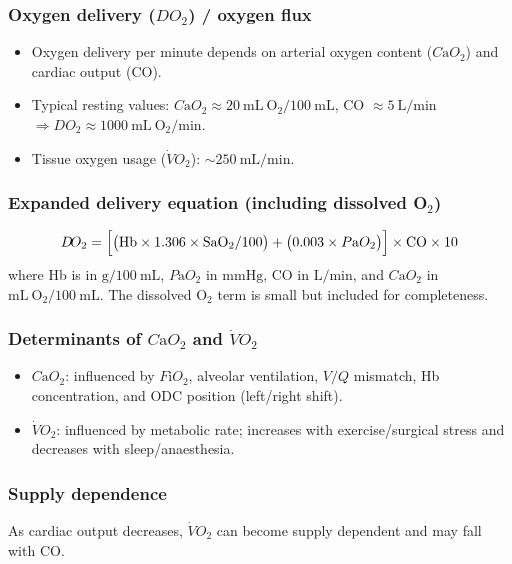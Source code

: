 \documentclass[11pt,a4paper]{article}
\begin{document}
\subsubsection{Oxygen delivery (\(D\!O_2\)) / oxygen flux}
\begin{itemize}
  \item Oxygen delivery per minute depends on arterial oxygen content (\(C\mathrm{a}O_2\)) and cardiac output (CO).
  \item Typical resting values: \(C\mathrm{a}O_2 \approx 20~\mathrm{mL~O_2}/100~\mathrm{mL}\), CO \(\approx 5~\mathrm{L/min}\) \(\Rightarrow D\!O_2 \approx 1000~\mathrm{mL~O_2/min}\).
  \item Tissue oxygen usage (\(\dot V\!O_2\)): \(\sim 250~\mathrm{mL/min}\).
\end{itemize}

\subsubsection{Expanded delivery equation (including dissolved O\(_2\))}
\[
D\!O_2 =
\Bigl[\bigl(\mathrm{Hb}\times 1.306\times \mathrm{SaO_2}/100\bigr) + \bigl(0.003\times P\mathrm{a}O_2\bigr)\Bigr]\times \mathrm{CO}\times 10
\]
\noindent where Hb is in \(\mathrm{g}/100~\mathrm{mL}\), \(P\mathrm{a}O_2\) in \(\mathrm{mmHg}\), CO in \(\mathrm{L/min}\), and \(C\mathrm{a}O_2\) in \(\mathrm{mL~O_2}/100~\mathrm{mL}\). The dissolved O\(_2\) term is small but included for completeness.

\subsubsection{Determinants of \(C\mathrm{a}O_2\) and \(\dot V\!O_2\)}
\begin{itemize}
  \item \(C\mathrm{a}O_2\): influenced by \(F\mathrm{i}O_2\), alveolar ventilation, \(V/Q\) mismatch, Hb concentration, and ODC position (left/right shift).
  \item \(\dot V\!O_2\): influenced by metabolic rate; increases with exercise/surgical stress and decreases with sleep/anaesthesia.
\end{itemize}

\subsubsection{Supply dependence}
As cardiac output decreases, \(\dot V\!O_2\) can become supply dependent and may fall with CO.
\end{document}
